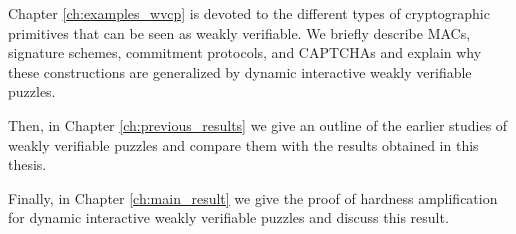 Chapter \ref{ch:examples_wvcp} is devoted to the different types of cryptographic primitives that
can be seen as weakly verifiable.
We briefly describe MACs, signature schemes, commitment protocols, and CAPTCHAs and explain why
these constructions are generalized by dynamic interactive weakly verifiable puzzles.

Then, in Chapter \ref{ch:previous_results} we give an outline of the earlier studies of weakly
verifiable puzzles and compare them with the results obtained in this thesis.

Finally, in Chapter \ref{ch:main_result} we give the proof of hardness amplification
for dynamic interactive weakly verifiable puzzles and discuss this result.

